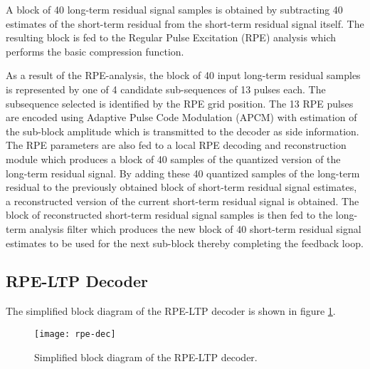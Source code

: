 A block of 40 long-term residual signal samples is obtained by
subtracting 40 estimates of the short-term residual from the
short-term residual signal itself. The resulting block is fed to the Regular
Pulse Excitation (RPE) analysis which performs the basic compression
function.

As a result of the RPE-analysis, the block of 40 input long-term
residual samples is represented by one of 4 candidate sub-sequences
of 13 pulses each. The subsequence selected is identified by the RPE
grid position. The 13 RPE pulses are encoded using Adaptive Pulse
Code Modulation (APCM) with estimation of the sub-block amplitude
which is transmitted to the decoder as side information. The RPE
parameters are also fed to a local RPE decoding and reconstruction
module which produces a block of 40 samples of the quantized version
of the long-term residual signal. By adding these 40 quantized
samples of the long-term residual to the previously obtained block of
short-term residual signal estimates, a reconstructed version of the
current short-term residual signal is obtained. The block of
reconstructed short-term residual signal samples is then fed to the
long-term analysis filter which produces the new block of 40
short-term residual signal estimates to be used for the next
sub-block thereby completing the feedback loop.

\subsection{RPE-LTP Decoder}

The simplified block diagram of the RPE-LTP decoder \cite{GSM-06.10}
is shown in figure \ref{rpe-decoder}.

\begin{figure}
    \begin{center}
        \texttt{[image: rpe-dec]}
  \end{center}
  \caption{Simplified block diagram of the RPE-LTP decoder.
         \label{rpe-decoder}}
\end{figure}


